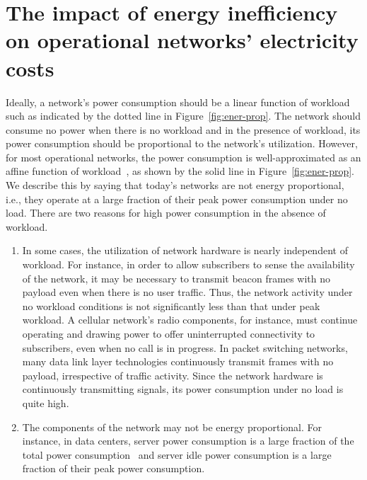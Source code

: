 \section{The impact of energy inefficiency on operational networks' electricity costs} 

Ideally, a network's power consumption should be a linear function of workload such as indicated by the dotted line in Figure~\ref{fig:ener-prop}. The network should consume no power when there is no workload and in the presence of workload, its power consumption should be proportional to the network's utilization. However, for most operational networks, the power consumption is well-approximated as an affine function of workload~\cite{Peng:2011:BTSSaving:Mobicom,Fan:power:ICSA:2007}, as shown by the solid line in Figure~\ref{fig:ener-prop}. We describe this by saying that today's networks are not energy proportional, i.e., they operate at a large fraction of their peak power consumption under no load. There are two reasons for high power consumption in the absence of workload. 
\begin{enumerate}
\item In some cases, the utilization of network hardware is nearly independent of workload. For instance, in order to allow subscribers to sense the availability of the network, it may be necessary to transmit beacon frames with no payload even when there is no user traffic. Thus, the network activity under no workload conditions is not significantly less than that under peak workload. A cellular network's radio components, for instance, must continue operating and drawing power to offer uninterrupted connectivity to subscribers, even when no call is in progress. In packet switching networks, many data link layer technologies continuously transmit frames with no payload, irrespective of traffic activity. Since the network hardware is continuously transmitting signals, its power consumption under no load is quite high.
\item The components of the network may not be energy proportional. For instance, in data centers, server power consumption is a large fraction of the total power consumption~\cite{costCloud} and server idle power consumption is a large fraction of their peak power consumption. 
\end{enumerate}

